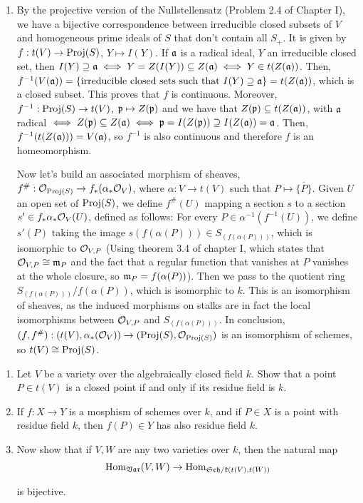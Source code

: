 \begin{sol}
\begin{enumerate}[label=\alph*)]
		\item By the projective version of the Nullstellensatz (Problem 2.4 of Chapter I), we have a bijective correspondence between irreducible closed subsets of $V$ and homogeneous prime ideals of $S$ that don't contain all $S_+$. It is given by $f: t(V) \to \mathrm{Proj}(S)$, $Y \mapsto I(Y)$. If $\mathfrak{a}$ is a radical ideal, $Y$ an irreducible closed set, then $I(Y) \supseteq \mathfrak{a} \iff Y = Z(I(Y)) \subseteq Z(\mathfrak{a}) \iff Y \in t(Z(\mathfrak{a}))$. Then, $f^{-1}(V(\mathfrak{a})) = \{\text{irreducible closed sets such that } I(Y) \supseteq \mathfrak{a} \} = t(Z(\mathfrak{a}))$, which is a closed subset. This proves that $f$ is continuous. Moreover, $f^{-1}: \mathrm{Proj}(S) \to t(V)$, $\mathfrak{p} \mapsto Z(\mathfrak{p})$ and we have that $Z(\mathfrak{p}) \subseteq t(Z(\mathfrak{a}))$, with $\mathfrak{a}$ radical $\iff Z(\mathfrak{p}) \subseteq Z(\mathfrak{a}) \iff \mathfrak{p} = I(Z(\mathfrak{p})) \supseteq I(Z(\mathfrak{a})) = \mathfrak{a}$. Then, $f^{-1}(t(Z(\mathfrak{a}))) = V(\mathfrak{a})$, so $f^{-1}$ is also continuous and therefore $f$ is an homeomorphism.

		Now let's build an associated morphism of sheaves, $f^{\#}: \mathcal{O}_{\mathrm{Proj}(S)} \to f_*(\alpha_* \mathcal{O}_V)$, where $\alpha: V \to t(V)$ such that $P \mapsto \overline{\{P\}}$. Given $U$ an open set of $\mathrm{Proj}(S)$, we define $f^{\#}(U)$ mapping a section $s$ to a section $s' \in f_*\alpha_* \mathcal{O}_V(U)$, defined as follows: For every $P \in \alpha^{-1}(f^{-1}(U))$, we define $s'(P)$ taking the image $s(f(\alpha(P))) \in S_{(f(\alpha(P)))}$, which is isomorphic to $\mathcal{O}_{V,P}$ (Using theorem 3.4 of chapter I, which states that $\mathcal{O}_{V,P} \cong \mathfrak{m}_P$ and the fact that a regular function that vanishes at $P$ vanishes at the whole closure, so $\mathfrak{m}_P = f(\alpha(P))$). Then we pass to the quotient ring $S_{(f(\alpha(P)))}/f(\alpha(P))$, which is isomorphic to $k$. This is an isomorphism of sheaves, as the induced morphisms on stalks are in fact the local isomorphisms between $\mathcal{O}_{V,P}$ and $S_{(f(\alpha(P)))}$. In conclusion, $(f,f^{\#}): (t(V), \alpha_*(\mathcal{O}_V)) \to (\mathrm{Proj}(S), \mathcal{O}_{\mathrm{Proj}(S)})$ is an isomorphism of schemes, so $t(V) \cong \mathrm{Proj}(S)$.		
	\end{enumerate}
\end{sol}

\begin{ex}
	\begin{enumerate}[label=\alph*)]
		\item Let $V$ be a variety over the algebraically closed field $k$. Show that a point $P \in t(V)$ is a closed point if and only if its residue field is $k$.

		\item If $f: X \to Y$ is a mosphism of schemes over $k$, and if $P \in X$ is a point with residue field $k$, then $f(P) \in Y$ has also residue field $k$.

		\item Now show that if $V,W$ are any two varieties over $k$, then the natural map
		\[
			\mathrm{Hom}_{\mathfrak{Var}}(V,W) \to \mathrm{Hom}_{\mathfrak{Sch/k}(t(V),t(W))}
		\]

		is bijective.
	\end{enumerate}
\end{ex}


